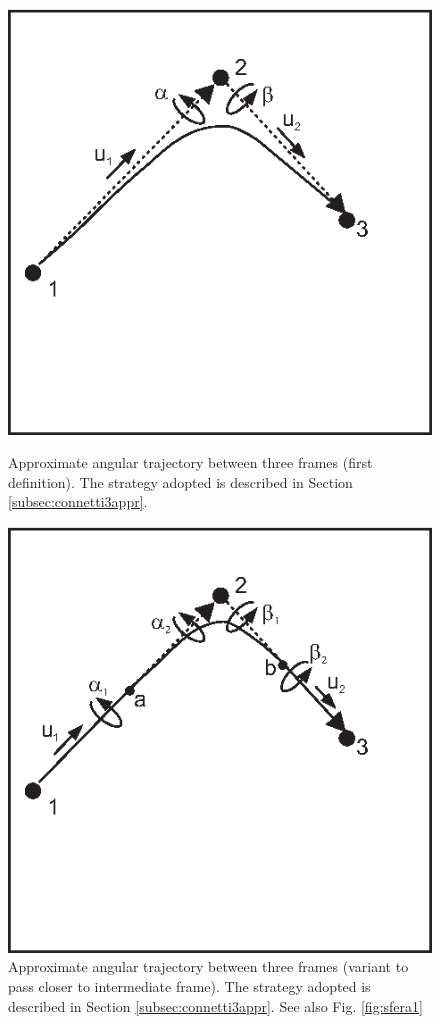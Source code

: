 \begin{figure}[tbp]
    \begin{minipage}[t]{0.49\textwidth}
        \centering
        \includegraphics{figures/connetti3a}
        \caption{Approximate angular trajectory between three frames (first definition). The strategy adopted is described in Section \ref{subsec:connetti3appr}.}
        \label{fig:connetti3a}
    \end{minipage}
    \hfill
    \begin{minipage}[t]{0.49\textwidth}
        \centering
        \includegraphics{figures/connetti3b}
        \caption{Approximate angular trajectory between three frames (variant to pass closer to intermediate frame). The strategy adopted is described in Section \ref{subsec:connetti3appr}. See also Fig. \ref{fig:sfera1}}
        \label{fig:connetti3b}
    \end{minipage}
\end{figure}

